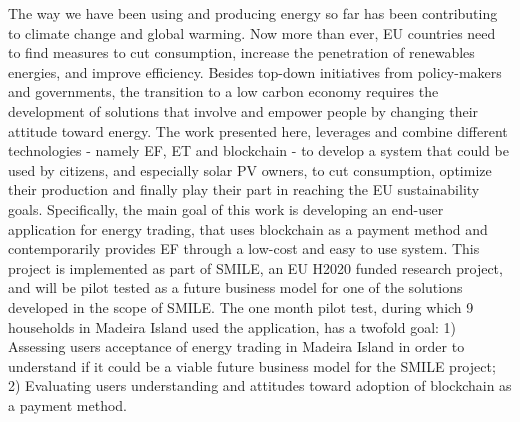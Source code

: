 \noindent The way we have been using and producing energy so far has been contributing to climate change and global warming. Now more than ever, \ac{EU} countries need to find measures to cut consumption, increase the penetration of renewables energies, and improve efficiency. Besides top-down initiatives from policy-makers and governments, the transition to a low carbon economy requires the development of solutions that involve and empower people by changing their attitude toward energy. The work presented here, leverages and combine different technologies - namely \ac{EF}, \ac{ET} and blockchain - to develop a system that could be used by citizens, and especially solar \ac{PV} owners, to cut consumption, optimize their production and finally play their part in reaching the \ac{EU} sustainability goals.
Specifically, the main goal of this work is developing an end-user application for energy trading, that uses blockchain as a payment method and contemporarily provides \ac{EF} through a low-cost and easy to use system. This project is implemented as part of \ac{SMILE}, an \ac{EU} H2020 funded research project, and will be pilot tested as a future business model for one of the solutions developed in the scope of SMILE.
The one month pilot test, during which 9 households in Madeira Island used the application, has a twofold goal:
1) Assessing users acceptance of energy trading in Madeira Island in order to understand if it could be a viable future business model for the \ac{SMILE} project;
2) Evaluating users understanding  and attitudes toward adoption of blockchain as a payment method.

